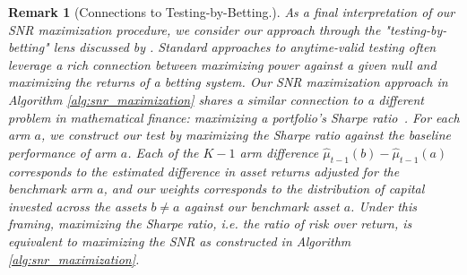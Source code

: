 \documentclass{article}
\newtheorem{remark}{Remark}
\begin{document}
\begin{remark}[Connections to Testing-by-Betting.] As a final interpretation of our SNR maximization procedure, we consider our approach through the "testing-by-betting" lens discussed by \cite{testing_as_betting}. Standard approaches to anytime-valid testing \citep{testing_by_betting_means, cho2024peekingpeaksequentialnonparametric, cho2024rewardmaximizationpureexploration} often leverage a rich connection between maximizing power against a given null and maximizing the returns of a betting system. Our SNR maximization approach in Algorithm \ref{alg:snr_maximization} shares a similar connection to a different problem in mathematical finance: maximizing a portfolio's Sharpe ratio~\citep{Sharpe1994}. For each arm $a$, we construct our test by maximizing the Sharpe ratio against the baseline performance of arm $a$. Each of the $K-1$ arm difference $\hat\mu_{t-1}(b) - \hat\mu_{t-1}(a)$ corresponds to the estimated difference in asset returns adjusted for the benchmark arm $a$, and our weights corresponds to the distribution of capital invested across the assets $b \neq a$ against our benchmark asset $a$. Under this framing, maximizing the Sharpe ratio, i.e. the ratio of risk over return, is equivalent to maximizing the SNR as constructed in Algorithm \ref{alg:snr_maximization}. 
\end{remark}
\end{document}
